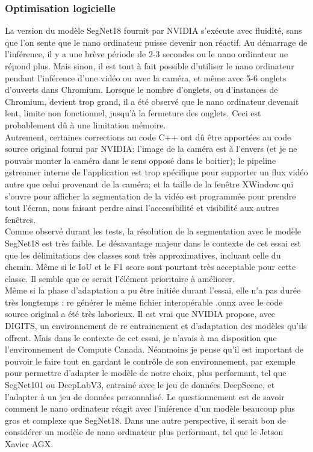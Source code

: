 \subsubsection{Optimisation logicielle}
\noindent La version du modèle SegNet18 fournit par NVIDIA s'exécute avec fluidité, sans que l'on sente que le nano ordinateur puisse devenir non réactif. Au démarrage de l'inférence, il y a une brève période de 2-3 secondes ou le nano ordinateur ne répond plus. Mais sinon, il est tout à fait possible d'utiliser le nano ordinateur pendant l'inférence d'une vidéo ou avec la caméra, et même avec 5-6 onglets d'ouverts dans Chromium. Lorsque le nombre d'onglets, ou d'instances de Chromium, devient trop grand, il a été observé que le nano ordinateur devenait lent, limite non fonctionnel, jusqu'à la fermeture des onglets. Ceci est probablement dû à une limitation mémoire.
\vspace{\baselineskip}
\\
\noindent Autrement, certaines corrections au code C++ ont dû être apportées au code source original fourni par NVIDIA: l'image de la caméra est à l'envers (et je ne pouvais monter la caméra dans le sens opposé dans le boitier); le pipeline gstreamer interne de l'application est trop spécifique pour supporter un flux vidéo autre que celui provenant de la caméra; et la taille de la fenêtre XWindow qui s'ouvre pour afficher la segmentation de la vidéo est programmée pour prendre tout l'écran, nous faisant perdre ainsi l'accessibilité et visibilité aux autres fenêtres.
\vspace{\baselineskip}
\\
\noindent Comme observé durant les tests, la résolution de la segmentation avec le modèle SegNet18 est très faible. Le désavantage majeur dans le contexte de cet essai est que les délimitations des classes sont très approximatives, incluant celle du chemin. Même si le IoU et le F1 score sont pourtant très acceptable pour cette classe. Il semble que ce serait l'élément prioritaire à améliorer. 
\vspace{\baselineskip}
\\
\noindent Même si la phase d'adaptation a pu être initiée durant l'essai, elle n'a pas durée très longtemps : re générer le même fichier interopérable .onnx avec le code source original a été très laborieux. Il est vrai que NVIDIA propose, avec DIGITS, un environnement de re entrainement et d'adaptation des modèles qu'ils offrent. Mais dans le contexte de cet essai, je n'avais à ma disposition que l'environnement de Compute Canada. Néanmoins je pense qu'il est important de pouvoir le faire tout en gardant le contrôle de son environnement, par exemple pour permettre d'adapter le modèle de notre choix, plus performant, tel que SegNet101 ou DeepLabV3, entrainé avec le jeu de données DeepScene, et l'adapter à un jeu de données personnalisé. Le questionnement est de savoir comment le nano ordinateur réagit avec l'inférence d'un modèle beaucoup plus gros et complexe que SegNet18. Dans une autre perspective, il serait bon de considérer un modèle de nano ordinateur plus performant, tel que le Jetson Xavier AGX.
